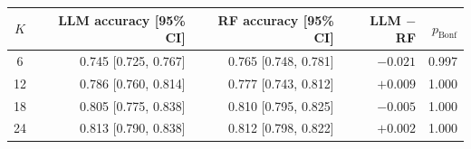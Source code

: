 \begin{tabular}{@{}crrrr@{}}
\toprule
$K$ & LLM accuracy [95\% CI] & RF accuracy [95\% CI] & LLM $-$ RF & $p_{\mathrm{Bonf}}$ \\
\midrule
6  & 0.745 [0.725, 0.767] & 0.765 [0.748, 0.781] & $-0.021$ & 0.997 \\
12 & 0.786 [0.760, 0.814] & 0.777 [0.743, 0.812] & $+0.009$ & 1.000 \\
18 & 0.805 [0.775, 0.838] & 0.810 [0.795, 0.825] & $-0.005$ & 1.000 \\
24 & 0.813 [0.790, 0.838] & 0.812 [0.798, 0.822] & $+0.002$ & 1.000 \\
\bottomrule
\end{tabular}
